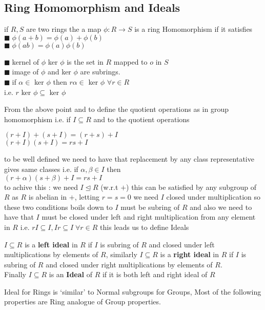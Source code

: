 \documentclass[11pt]{extarticle}
\newcommand{\ra}{\rightarrow}
\newcommand{\tbx}[2][]{
	\begin{tcolorbox}[enhanced,breakable,size=small,colback=black!2!white,title={#1},arc is angular, arc=1.5mm,drop fuzzy shadow]
		#2
	\end{tcolorbox}
}
\newcommand{\y}{$\blacksquare\;$}
\begin{document}
\begin{multicols}{2}
		\section{Ring Homomorphism and Ideals}
		
\tbx{if $ R,S $ are two rings the a map $ \phi :R \ra S $ is a ring Homomorphism if it satisfies
			\y $ \phi(a+b)=\phi(a)+\phi(b) $ \\
			\y $ \phi(ab)=\phi(a)\phi(b) $ \\
			} 
\tbx{\y kernel of $ \phi  $ ker $\phi $ is the set in $ R $ mapped to $ o $ in $ S $
\\
\y image of $ \phi $ and ker $\phi  $ are subrings.\\
\y if $\alpha\in   $ ker $ \phi $ then $ r\alpha \in  $ ker $ \phi $ $ \forall r \in R $\\
			i.e. $ r $ ker $ \phi \subseteq  $ ker $ \phi $
			} 
\tbx[Concept of Ideal]{From the above point and to define the quotient operations as in group homomorphism i.e. if  $ I \subseteq R $ and to the quotient operations 
			\begin{center}
				$ (r+I)+(s+I)=(r+s)+I $\\
				$ (r+I)(s+I)=rs+I $
			\end{center}
			to be well defined we need to have that replacement by any class representative gives same classes i.e.
			if $ \alpha, \beta \in I $ then \\
			$ (r+\alpha)(s+\beta)+I=rs+I $\\
			to achive this : we need $ I \trianglelefteq R $ (w.r.t $ + $) this can be satisfied by any subgroup of $ R $ as $ R $ is abelian in $ + $, letting $ r=s=0 $ we need $ I $ closed under multiplication so these two conditions boils down to $ I $ must be subring of $ R $ 
			and also we need to have that $ I $ must be closed under left and right multiplication from any element in $ R $
			i.e. $ rI \subseteq I, Ir\subseteq I \; \forall r\in R $ this leads us to define Ideals
			} 
\tbx{$I \subseteq R  $ is a \textbf{left ideal} in $ R $ if $ I $ is subring of $ R $ and closed under left multiplications by elements of $ R $, similarly $I \subseteq R  $ is a \textbf{right ideal} in $ R $ if $ I $ is subring of $ R $ and closed under right multiplications by elements of $ R $.\\
			Finally $ I \subseteq R $ is an \textbf{Ideal }of $ R $ if it is both left and right ideal of $ R $
			} 
\tbx{Ideal for Rings is `similar' to Normal subgroups for Groups, Most of the following properties are Ring analogue of Group properties.
}
\end{multicols}
\end{document}
